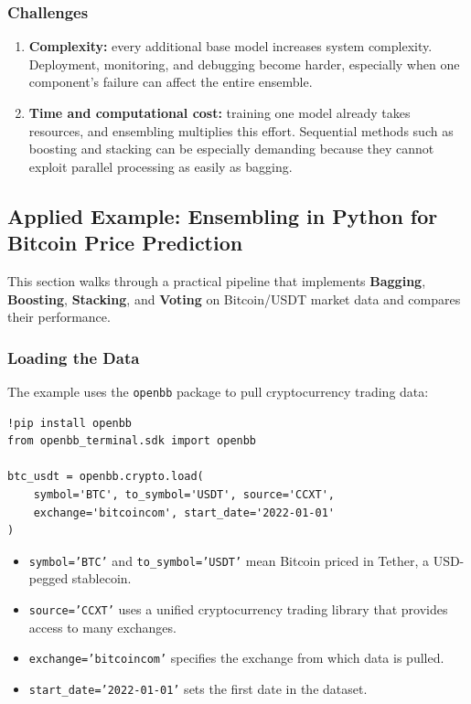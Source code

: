 \documentclass[12pt,openany]{book}
\begin{document}
\subsubsection{Challenges}

\begin{enumerate}[leftmargin=*]
    \item \textbf{Complexity:} every additional base model increases system complexity. Deployment, monitoring, and debugging become harder, especially when one component's failure can affect the entire ensemble.
    \item \textbf{Time and computational cost:} training one model already takes resources, and ensembling multiplies this effort. Sequential methods such as boosting and stacking can be especially demanding because they cannot exploit parallel processing as easily as bagging.
\end{enumerate}

\subsection{Applied Example: Ensembling in Python for Bitcoin Price Prediction}

This section walks through a practical pipeline that implements \textbf{Bagging}, \textbf{Boosting}, \textbf{Stacking}, and \textbf{Voting} on Bitcoin/USDT market data and compares their performance.

\subsubsection{Loading the Data}

The example uses the \texttt{openbb} package to pull cryptocurrency trading data:

\begin{Verbatim}[breaklines=true,breakanywhere=true,fontsize=\small]
!pip install openbb
from openbb_terminal.sdk import openbb

btc_usdt = openbb.crypto.load(
    symbol='BTC', to_symbol='USDT', source='CCXT',
    exchange='bitcoincom', start_date='2022-01-01'
)
\end{Verbatim}

\begin{itemize}[leftmargin=*]
    \item \texttt{symbol='BTC'} and \texttt{to\_symbol='USDT'} mean Bitcoin priced in Tether, a USD-pegged stablecoin.
    \item \texttt{source='CCXT'} uses a unified cryptocurrency trading library that provides access to many exchanges.
    \item \texttt{exchange='bitcoincom'} specifies the exchange from which data is pulled.
    \item \texttt{start\_date='2022-01-01'} sets the first date in the dataset.
\end{itemize}
\end{document}
